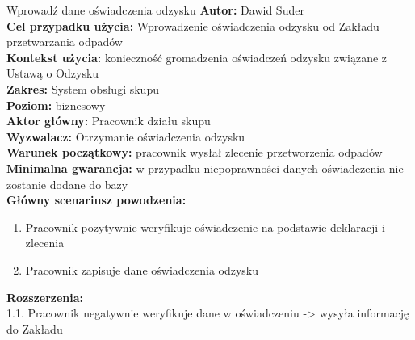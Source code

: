 	\begin{usecase}{Wprowadź dane oświadczenia odzysku}
	\textbf{Autor:} Dawid Suder \\
	\textbf{Cel przypadku użycia:} Wprowadzenie oświadczenia odzysku od Zakładu przetwarzania odpadów \\
	\textbf{Kontekst użycia:} konieczność gromadzenia oświadczeń odzysku związane z Ustawą o Odzysku \\
	\textbf{Zakres:} System obsługi skupu \\
	\textbf{Poziom:} biznesowy \\
	\textbf{Aktor główny:} Pracownik działu skupu\\
	\textbf{Wyzwalacz:} Otrzymanie oświadczenia odzysku \\
	\textbf{Warunek początkowy:} pracownik wysłał zlecenie przetworzenia odpadów \\
	\textbf{Minimalna gwarancja:} w przypadku niepoprawności danych oświadczenia nie zostanie dodane do bazy \\
	\textbf{Główny scenariusz powodzenia:} \\
		\begin{enumerate}
			\item Pracownik pozytywnie weryfikuje oświadczenie na podstawie deklaracji i zlecenia
			\item Pracownik zapisuje dane oświadczenia odzysku
		\end{enumerate}
	\textbf{Rozszerzenia:} \\
			1.1. Pracownik negatywnie weryfikuje dane w oświadczeniu -> wysyła informację do Zakładu
	\end{usecase}


